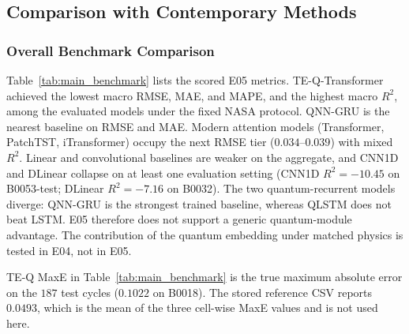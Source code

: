 \documentclass[a4paper,fleqn]{cas-sc}
\begin{document}
\subsection{Comparison with Contemporary Methods}
\label{sec:contemporary_comparison}

\subsubsection{Overall Benchmark Comparison}
\label{sec:overall_benchmark}

Table~\ref{tab:main_benchmark} lists the scored E05 metrics. TE-Q-Transformer achieved the lowest macro RMSE, MAE, and MAPE, and the highest macro $R^2$, among the evaluated models under the fixed NASA protocol. QNN-GRU is the nearest baseline on RMSE and MAE. Modern attention models (Transformer, PatchTST, iTransformer) occupy the next RMSE tier ($0.034$--$0.039$) with mixed $R^2$. Linear and convolutional baselines are weaker on the aggregate, and CNN1D and DLinear collapse on at least one evaluation setting (CNN1D $R^2=-10.45$ on B0053-test; DLinear $R^2=-7.16$ on B0032). The two quantum-recurrent models diverge: QNN-GRU is the strongest trained baseline, whereas QLSTM does not beat LSTM. E05 therefore does not support a generic quantum-module advantage. The contribution of the quantum embedding under matched physics is tested in E04, not in E05.

TE-Q MaxE in Table~\ref{tab:main_benchmark} is the true maximum absolute error on the $187$ test cycles ($0.1022$ on B0018). The stored reference CSV reports $0.0493$, which is the mean of the three cell-wise MaxE values and is not used here.
\end{document}
